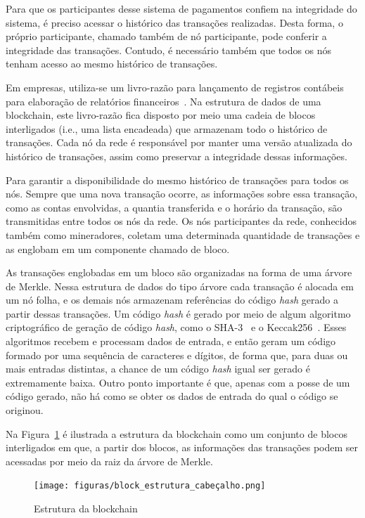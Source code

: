 Para que os participantes desse sistema de pagamentos confiem na integridade do sistema, é preciso acessar o histórico das transações realizadas. Desta forma, o próprio participante, chamado também de nó participante, pode conferir a integridade das transações. Contudo, é necessário também que todos os nós tenham acesso ao mesmo histórico de transações.

Em empresas, utiliza-se um livro-razão para lançamento de registros contábeis para elaboração de relatórios financeiros~\cite{marion1985contabilidade}. Na estrutura de dados de uma blockchain, este livro-razão fica disposto por meio uma cadeia de blocos interligados (i.e., uma lista encadeada) que armazenam todo o histórico de transações. Cada nó da rede é responsável por manter uma versão atualizada do histórico de transações, assim como preservar a integridade dessas informações.

Para garantir a disponibilidade do mesmo histórico de transações para todos os nós. Sempre que uma nova transação ocorre, as informações sobre essa transação, como as contas envolvidas, a quantia transferida e o horário da transação, são transmitidas entre todos os nós da rede. Os nós participantes da rede, conhecidos também como mineradores, coletam uma determinada quantidade de transações e as englobam em um componente chamado de bloco.

As transações englobadas em um bloco são organizadas na forma de uma árvore de Merkle. Nessa estrutura de dados do tipo árvore cada transação é alocada em um nó folha, e os demais nós armazenam referências do código \textit{hash} gerado a partir dessas transações. Um código \textit{hash} é gerado por meio de algum algoritmo criptográfico de geração de código \textit{hash}, como o SHA-3~\cite{dworkin2015sha3} e o Keccak256~\cite{bertoni2020keccak}. Esses algoritmos recebem e processam dados de entrada, e então geram um código formado por uma sequência de caracteres e dígitos, de forma que, para duas ou mais entradas distintas, a chance de um código \textit{hash} igual ser gerado é extremamente baixa. Outro ponto importante é que, apenas com a posse de um código gerado, não há como se obter os dados de entrada do qual o código se originou.

Na Figura~\ref{fig:blockchain_estrutura} é ilustrada a estrutura da blockchain como um conjunto de blocos interligados em que, a partir dos blocos, as informações das transações podem ser acessadas por meio da raiz da árvore de Merkle. 

\begin{figure}[htb]
 \caption{Estrutura da blockchain}
 \label{fig:blockchain_estrutura}
 \centering
 \texttt{[image: figuras/block\_estrutura\_cabeçalho.png]}
\end{figure}

